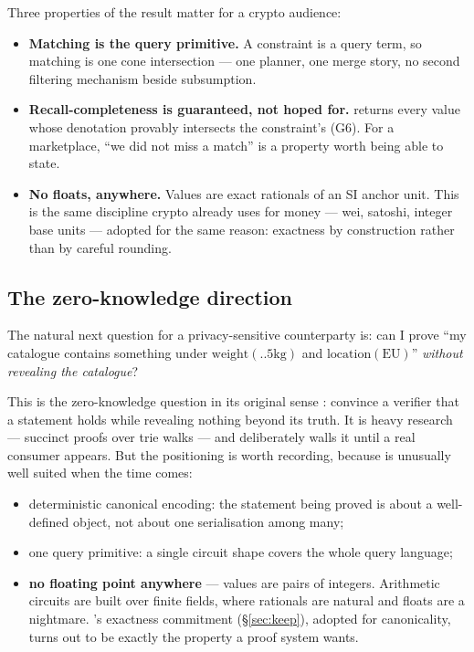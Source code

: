 Three properties of the result matter for a crypto audience:

\begin{itemize}[leftmargin=1.4em]
\item \textbf{Matching is the query primitive.} A constraint is a query term,
  so matching is one cone intersection --- one planner, one merge story, no
  second filtering mechanism beside subsumption.
\item \textbf{Recall-completeness is guaranteed, not hoped for.}
   returns every value whose denotation provably
  intersects the constraint's (G6). For a marketplace, ``we did not miss a
  match'' is a property worth being able to state.
\item \textbf{No floats, anywhere.} Values are exact rationals of an SI anchor
  unit. This is the same discipline crypto already uses for money --- wei,
  satoshi, integer base units --- adopted for the same reason: exactness by
  construction rather than by careful rounding.
\end{itemize}

\subsection{The zero-knowledge direction}
\label{sec:crypto-zk}

The natural next question for a privacy-sensitive counterparty is: can I prove
``my catalogue contains something under $\mathrm{weight}(..5\mathrm{kg})$ and
$\mathrm{location}(\mathrm{EU})$'' \emph{without revealing the catalogue}?

This is the zero-knowledge question in its original sense
\citep{goldwasser1989}: convince a verifier that a statement holds while
revealing nothing beyond its truth. It is heavy research --- succinct proofs
over trie walks --- and \odag{} deliberately walls it until a real consumer appears. But the positioning is
worth recording, because \odag{} is unusually well suited when the time comes:

\begin{itemize}[leftmargin=1.4em]
\item deterministic canonical encoding: the statement being proved is about a
  well-defined object, not about one serialisation among many;
\item one query primitive: a single circuit shape covers the whole query
  language;
\item \textbf{no floating point anywhere} --- values are pairs of integers.
  Arithmetic circuits are built over finite fields, where rationals are
  natural and floats are a nightmare. \odag{}'s exactness commitment
  (\S\ref{sec:keep}), adopted for canonicality, turns out to be exactly the
  property a proof system wants.
\end{itemize}

